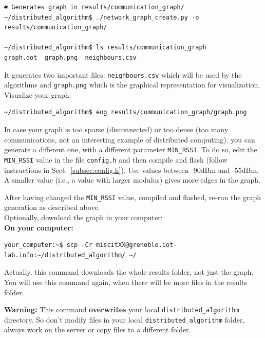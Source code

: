 \documentclass[oneside]{article}
\begin{document}
\begin{verbatim}# Generates graph in results/communication_graph/
~/distributed_algorithm$ ./network_graph_create.py -o results/communication_graph/

~/distributed_algorithm$ ls results/communication_graph
graph.dot  graph.png  neighbours.csv \end{verbatim}

It generates two important files:
\texttt{neighbours.csv} which will be used by the algorithms and
\texttt{graph.png} which is the graphical representation for visualization.\\

Visualize your graph:
\begin{verbatim}
~/distributed_algorithm$ eog results/communication_graph/graph.png
\end{verbatim}

In case your graph is too sparse (disconnected) 
or too dense (too many communications, 
not an interesting example of distributed computing).
you can generate a different one,
with a different parameter \verb=MIN_RSSI=.
To do so, edit the \verb=MIN_RSSI= value in the file
\verb=config.h=  and then compile and flash
(follow instructions in Sect.~\ref{subsec:config.h}).
Use values between -90dBm  and -55dBm.
A smaller value (i.e., a value with larger modulus) gives more edges in the graph.

After having changed the \verb=MIN_RSSI= value, compiled and flashed, re-run the graph generation as described above.\\

Optionally, download the graph in your computer:\\
\textbf{On your computer:} 
\begin{verbatim}
your_computer:~$ scp -Cr miscitXX@grenoble.iot-lab.info:~/distributed_algorithm/ ~/
\end{verbatim}
Actually, this command downloads the whole results folder, not just the graph. You will use this command again, when there will be more files in the results folder.

\textbf{Warning:} \quad This command \textbf{overwrites} your local \verb=distributed_algorithm= directory.  So don't modify files in your local \verb=distributed_algorithm= folder, always work on the server or copy files to a different folder.
\end{document}
